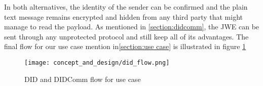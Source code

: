 In both alternatives, the identity of the sender can be confirmed and the plain text message remains encrypted and hidden from any third party that might manage to read the payload. As mentioned in \autoref{section:didcomm}, the JWE can be sent through any unprotected protocol and still keep all of its advantages. The final flow for our use case mention in\ref{section:use case} is illustrated in figure \ref{fig:did_flow}

\begin{figure}[h]
  \centering
  \texttt{[image: concept\_and\_design/did\_flow.png]}
  \caption{DID and DIDComm flow for use case}
  \label{fig:did_flow}
\end{figure}





















